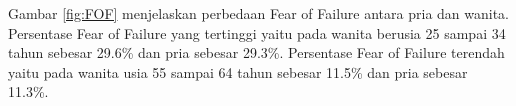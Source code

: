 Gambar \ref{fig:FOF} menjelaskan perbedaan Fear of Failure antara pria dan wanita. Persentase Fear of Failure yang tertinggi yaitu pada wanita berusia 25 sampai 34 tahun sebesar 29.6\% dan pria sebesar 29.3\%. Persentase Fear of Failure terendah yaitu pada wanita usia 55 sampai 64 tahun sebesar 11.5\% dan pria sebesar 11.3\%. 



